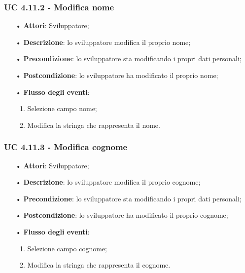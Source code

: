 \subsubsection{UC 4.11.2 - Modifica nome}
\begin{itemize}
	\item[•]\textbf{Attori}: Sviluppatore;
	\item[•]\textbf{Descrizione}: lo sviluppatore modifica il proprio nome;
	\item[•]\textbf{Precondizione}: lo sviluppatore sta modificando i propri dati personali;
	\item[•]\textbf{Postcondizione}: lo sviluppatore ha modificato il proprio nome; 
	\item[•]\textbf{Flusso degli eventi}: 
	\begin{enumerate}
		\item Selezione campo nome;
		\item Modifica la stringa che rappresenta il nome.
	\end{enumerate}
\end{itemize}
\subsubsection{UC 4.11.3 - Modifica cognome}
\begin{itemize}
	\item[•]\textbf{Attori}: Sviluppatore;
	\item[•]\textbf{Descrizione}: lo sviluppatore modifica il proprio cognome;
	\item[•]\textbf{Precondizione}: lo sviluppatore sta modificando i propri dati personali;
	\item[•]\textbf{Postcondizione}: lo sviluppatore ha modificato il proprio cognome; 
	\item[•]\textbf{Flusso degli eventi}: 
	\begin{enumerate}
		\item Selezione campo cognome;
		\item Modifica la stringa che rappresenta il cognome.
	\end{enumerate}
\end{itemize}
